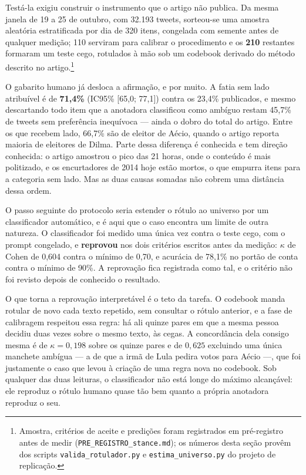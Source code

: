 Testá-la exigiu construir o instrumento que o artigo não publica. Da mesma janela de
19 a 25 de outubro, com 32.193 tweets, sorteou-se uma amostra aleatória estratificada
por dia de 320 itens, congelada com semente antes de qualquer medição; 110 serviram
para calibrar o procedimento e os \textbf{210} restantes formaram um teste cego,
rotulados à mão sob um codebook derivado do método descrito no artigo.\footnote{Amostra,
critérios de aceite e predições foram registrados em pré-registro antes de medir
(\texttt{PRE\_REGISTRO\_stance.md}); os números desta seção provêm dos scripts
\texttt{valida\_rotulador.py} e \texttt{estima\_universo.py} do projeto de replicação.}

O gabarito humano já desloca a afirmação, e por muito. A fatia sem lado atribuível é
de \textbf{71,4\%} (IC95\% [65,0; 77,1]) contra os 23,4\% publicados, e mesmo
descartando todo item que a anotadora classificou como ambíguo restam 45,7\% de
tweets sem preferência inequívoca --- ainda o dobro do total do artigo. Entre os que
recebem lado, 66,7\% são de eleitor de Aécio, quando o artigo reporta maioria de
eleitores de Dilma. Parte dessa diferença é conhecida e tem direção conhecida: o
artigo amostrou o pico das 21 horas, onde o conteúdo é mais politizado, e os
encurtadores de 2014 hoje estão mortos, o que empurra itens para a categoria sem
lado. Mas as duas causas somadas não cobrem uma distância dessa ordem.

O passo seguinte do protocolo seria estender o rótulo ao universo por um classificador
automático, e é aqui que o caso encontra um limite de outra natureza. O classificador
foi medido uma única vez contra o teste cego, com o prompt congelado, e
\textbf{reprovou} nos dois critérios escritos antes da medição: $\kappa$ de Cohen de
0,604 contra o mínimo de 0,70, e acurácia de 78,1\% no portão de conta contra o mínimo
de 90\%. A reprovação fica registrada como tal, e o critério não foi revisto depois de
conhecido o resultado.

O que torna a reprovação interpretável é o teto da tarefa. O codebook manda rotular de
novo cada texto repetido, sem consultar o rótulo anterior, e a fase de calibragem
respeitou essa regra: há ali quinze pares em que a mesma pessoa decidiu duas vezes
sobre o mesmo texto, às cegas. A concordância dela consigo mesma é de $\kappa=0{,}198$
sobre os quinze pares e de $0{,}625$ excluindo uma única manchete ambígua --- a de que
a irmã de Lula pedira votos para Aécio ---, que foi justamente o caso que levou à
criação de uma regra nova no codebook. Sob qualquer das duas leituras, o classificador
não está longe do máximo alcançável: ele reproduz o rótulo humano quase tão bem quanto
a própria anotadora reproduz o seu.

